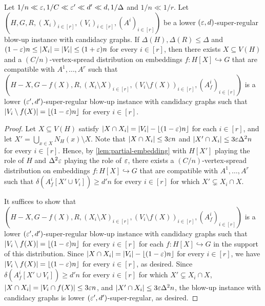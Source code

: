 \documentclass[11pt]{amsart}
\begin{document}
\begin{lemma}\label{lem:cluster-rebalancing}
    Let $1 / n \ll \varepsilon, 1/ C \ll \varepsilon' \ll d' \ll d, 1 / \Delta$ and $1 / n \ll 1 / r$.
    Let $(H, G, R, (X_i)_{i\in [r]},\allowbreak (V_i)_{i\in [r]},(A^i)_{i \in [r]})$ be a lower $(\varepsilon, d)$-super-regular blow-up instance with candidacy graphs.  If $\Delta(H), \Delta(R) \leq \Delta$ and $(1 - \varepsilon)n \leq |X_i| = |V_i| \leq (1 + \varepsilon)n$ for every $i \in [r]$, then there exists $X \subseteq V(H)$ and a $(C / n)$-vertex-spread distribution on embeddings $f : H[X] \hookrightarrow G$ that are compatible with $A^1, \dots, A^r$ such that $(H - X, G - f(X), R, (X_i\setminus X)_{i\in [r]},\allowbreak (V_i\setminus f(X))_{i\in [r]},(A_f^i)_{i \in [r]})$ is a lower $(\varepsilon', d')$-super-regular blow-up instance with candidacy graphs such that $|V_i \setminus f(X)| = \lfloor (1 - \varepsilon) n\rfloor$ for every $i \in [r]$. 
\end{lemma}
\begin{proof}
    Let $X \subseteq V(H)$ satisfy $|X \cap X_i| = |V_i| - \lfloor (1 - \varepsilon)n\rfloor$ for each $i \in [r]$, and let $X' = \bigcup_{x\in X}N_H(x) \setminus X$.  Note that $|X \cap X_i| \leq 3\varepsilon n$ and $|X' \cap X_i| \leq 3\varepsilon \Delta^2 n$ for every $i \in [r]$.  Hence, by \cref{lem:partial-embedding} with $H[X']$ playing the role of $H$ and $\Delta^2\varepsilon$ playing the role of $\varepsilon$, there exists a $(C / n)$-vertex-spread distribution on embeddings $f : H[X]\hookrightarrow G$ that are compatible with $A^1, \dots, A^r$ such that $\delta(A^i_f[X' \cup V_i]) \geq d' n$ for every $i \in [r]$ for which $X' \subsetneq X_i \cap X$.  

    It suffices to show that $(H - X, G - f(X), R, (X_i\setminus X)_{i\in [r]},\allowbreak (V_i\setminus f(X))_{i\in [r]},(A_f^i)_{i \in [r]})$ is a lower $(\varepsilon', d')$-super-regular blow-up instance with candidacy graphs such that $|V_i \setminus f(X)| = \lfloor (1 - \varepsilon) n\rfloor$ for every $i \in [r]$ for each $f : H[X] \hookrightarrow G$ in the support of this distribution.  Since $|X \cap X_i| = |V_i| - \lfloor (1 - \varepsilon)n\rfloor$ for every $i \in [r]$, we have $|V_i \setminus f(X)| = \lfloor (1 - \varepsilon)n\rfloor$ for every $i \in [r]$, as desired.
    Since $\delta(A^i_f[X' \cup V_i]) \geq d' n$ for every $i \in [r]$ for which $X' \subsetneq X_i \cap X$, $|X \cap X_i| = |V_i \cap f(X)| \leq 3\varepsilon n$, and $|X' \cap X_i| \leq 3\varepsilon\Delta^2 n$, the blow-up instance with candidacy graphs is lower $(\varepsilon', d')$-super-regular, as desired. 
\end{proof}
\end{document}
